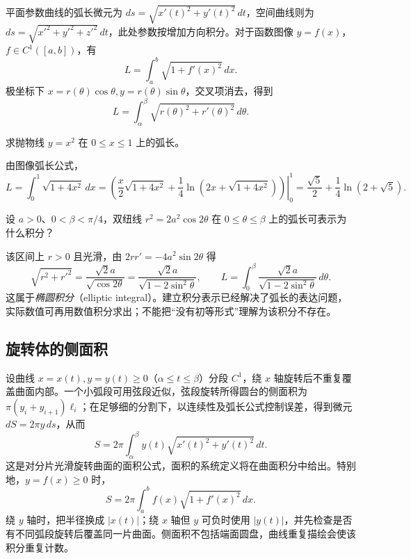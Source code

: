 平面参数曲线的弧长微元为 $ds=\sqrt{x'(t)^2+y'(t)^2}\,dt$，空间曲线则为 $ds=\sqrt{x'^2+y'^2+z'^2}\,dt$，此处参数按增加方向积分。对于函数图像 $y=f(x)$，$f\in C^1([a,b])$，有
\[
    L=\int_a^b\sqrt{1+f'(x)^2}\,dx.
\]
极坐标下 $x=r(\theta)\cos\theta,y=r(\theta)\sin\theta$，交叉项消去，得到
\begin{equation}
    L=\int_\alpha^\beta\sqrt{r(\theta)^2+r'(\theta)^2}\,d\theta.
    \label{eq:polar-arc-length}
\end{equation}

\begin{example}
\label{ex:parabola-arc-length}
求抛物线 $y=x^2$ 在 $0\leq x\leq1$ 上的弧长。
\end{example}
\begin{solve}
由图像弧长公式，
\[
    L=\int_0^1\sqrt{1+4x^2}\,dx
    =\left.\left(\frac{x}{2}\sqrt{1+4x^2}
       +\frac14\ln(2x+\sqrt{1+4x^2})\right)\right|_0^1
    =\frac{\sqrt5}{2}+\frac14\ln(2+\sqrt5).
\]
\end{solve}

\begin{example}
\label{ex:lemniscate-elliptic-arc-length}
设 $a>0$、$0<\beta<\pi/4$，双纽线 $r^2=2a^2\cos2\theta$ 在 $0\leq\theta\leq\beta$ 上的弧长可表示为什么积分？
\end{example}
\begin{solve}
该区间上 $r>0$ 且光滑，由 $2rr'=-4a^2\sin2\theta$ 得
\[
    \sqrt{r^2+r'^2}
    =\frac{\sqrt2a}{\sqrt{\cos2\theta}}
    =\frac{\sqrt2a}{\sqrt{1-2\sin^2\theta}},
    \qquad
    L=\int_0^\beta\frac{\sqrt2a}{\sqrt{1-2\sin^2\theta}}\,d\theta.
\]
这属于\emph{椭圆积分}（elliptic integral）。建立积分表示已经解决了弧长的表达问题，实际数值可再用数值积分求出；不能把“没有初等形式”理解为该积分不存在。
\end{solve}

\subsection{旋转体的侧面积}
\label{subsec:lateral-areas-of-solids-of-revolution}

设曲线 $x=x(t),y=y(t)\geq0$（$\alpha\leq t\leq\beta$）分段 $C^1$，绕 $x$ 轴旋转后不重复覆盖曲面内部。一个小弧段可用弦段近似，弦段旋转所得圆台的侧面积为 $\pi(y_i+y_{i+1})\ell_i$；在足够细的分割下，以连续性及弧长公式控制误差，得到微元 $dS=2\pi y\,ds$，从而
\begin{equation}
    S=2\pi\int_\alpha^\beta
      y(t)\sqrt{x'(t)^2+y'(t)^2}\,dt.
    \label{eq:surface-of-revolution-area}
\end{equation}
这是对分片光滑旋转曲面的面积公式，面积的系统定义将在曲面积分中给出。特别地，$y=f(x)\geq0$ 时，
\[
    S=2\pi\int_a^b f(x)\sqrt{1+f'(x)^2}\,dx.
\]
绕 $y$ 轴时，把半径换成 $|x(t)|$；绕 $x$ 轴但 $y$ 可负时使用 $|y(t)|$，并先检查是否有不同弧段旋转后覆盖同一片曲面。侧面积不包括端面圆盘，曲线重复描绘会使该积分重复计数。

